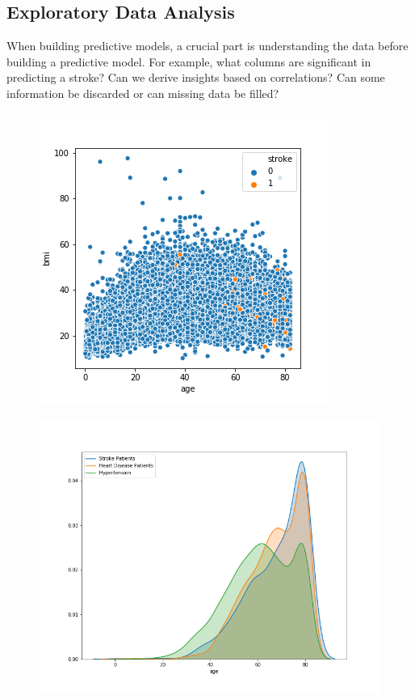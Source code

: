 \documentclass[proposal]{softeng}
\begin{document}
\subsection{Exploratory Data Analysis}
When building predictive models, a crucial part is understanding the data before building a predictive model. For example, what columns are significant in predicting a stroke? Can we derive insights based on correlations? Can some information be discarded or can missing data be filled? 

\begin{figure}
\centering
\begin{minipage}[t]{.4\textwidth}
  \centering
  \includegraphics[width=\textwidth]{images/building_ann/age_bmi_scatterplot.png}
  \label{fig:age_bmi_scatterplot}
\end{minipage}
\begin{minipage}[t]{.5\textwidth}
  \centering
  \includegraphics[width=\textwidth]{images/building_ann/stroke_age_distplot.png}

\end{minipage}
\end{figure}
\end{document}
